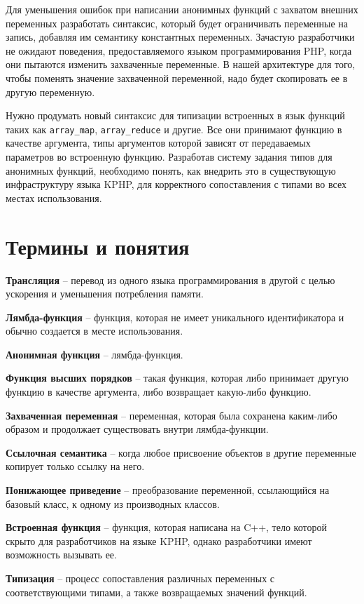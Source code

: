 Для уменьшения ошибок при написании анонимных функций с захватом внешних переменных разработать синтаксис, который будет ограничивать переменные на запись, добавляя им семантику константных переменных.
Зачастую разработчики не ожидают поведения, предоставляемого языком программирования PHP, когда они пытаются изменить захваченные переменные.
В нашей архитектуре для того, чтобы поменять значение захваченной переменной, надо будет скопировать ее в другую переменную.

Нужно продумать новый синтаксис для типизации встроенных в язык функций таких как \verb|array_map|, \verb|array_reduce| и другие.
Все они принимают функцию в качестве аргумента, типы аргументов которой зависят от передаваемых параметров во встроенную функцию.
Разработав систему задания типов для анонимных функций, необходимо понять, как внедрить это в существующую инфраструктуру языка KPHP, для корректного сопоставления с типами во всех местах использования.

\section{Термины и понятия}
\textbf{Трансляция} -- перевод из одного языка программирования в другой с целью ускорения и уменьшения потребления памяти.

\textbf{Лямбда-функция} -- функция, которая не имеет уникального идентификатора и обычно создается в месте использования.

\textbf{Анонимная функция} -- лямбда-функция.

\textbf{Функция высших порядков} -- такая функция, которая либо принимает другую функцию в качестве аргумента, либо возвращает какую-либо функцию.

\textbf{Захваченная переменная} -- переменная, которая была сохранена каким-либо образом и продолжает существовать внутри лямбда-функции.

\textbf{Ссылочная семантика} -- когда любое присвоение объектов в другие переменные копирует только ссылку на него.

\textbf{Понижающее приведение} -- преобразование переменной, ссылающийся на базовый класс, к одному из производных классов.

\textbf{Встроенная функция} -- функция, которая написана на C++, тело которой скрыто для разработчиков на языке KPHP, однако разработчики имеют возможность вызывать ее.

\textbf{Типизация} -- процесс сопоставления различных переменных с соответствующими типами, а также возвращаемых значений функций.

